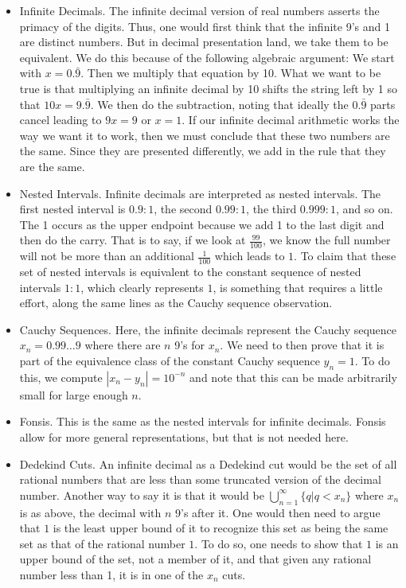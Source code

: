 \documentclass[12pt]{article}
\begin{document}
\begin{itemize}
    \item Infinite Decimals. The infinite decimal version of real numbers asserts the primacy of the digits. Thus, one would first think that the infinite 9's and 1 are distinct numbers. But in decimal presentation land, we take them to be equivalent. We do this because of the following algebraic argument: We start with $x = 0.\bar{9}$. Then we multiply that equation by 10. What we want to be true is that multiplying an infinite decimal by 10 shifts the string left by 1 so that $10x = 9.\bar{9}$. We then do the subtraction, noting that ideally the $0.\bar{9}$ parts cancel leading to $9x = 9$ or $x=1$. If our infinite decimal arithmetic works the way we want it to work, then we must conclude that these two numbers are the same. Since they are presented differently, we add in the rule that they are the same. 
    \item Nested Intervals. Infinite decimals are interpreted as nested intervals. The first nested interval is $0.9:1$, the second $0.99:1$, the third $0.999:1$, and so on. The 1 occurs as the upper endpoint because we add 1 to the last digit and then do the carry. That is to say, if we look at $\frac{99}{100}$, we know the full number will not be more than an additional $\frac{1}{100}$ which leads to $1$. To claim that these set of nested intervals is equivalent to the constant sequence of nested intervals $1:1$, which clearly represents $1$, is something that requires a little effort, along the same lines as the Cauchy sequence observation. 
    \item Cauchy Sequences. Here, the infinite decimals represent the Cauchy sequence $x_n = 0.99\ldots9$ where there are $n$ 9's for $x_n$. We need to then prove that it is part of the equivalence class of the constant Cauchy sequence $y_n = 1$. To do this, we compute $|x_n - y_n| = 10^{-n}$ and note that this can be made arbitrarily small for large enough $n$.
    \item Fonsis. This is the same as the nested intervals for infinite decimals. Fonsis allow for more general representations, but that is not needed here. 
    \item Dedekind Cuts.  An infinite decimal as a Dedekind cut would be the set of all rational numbers that are less than some truncated version of the decimal number. Another way to say it is that it would be $\bigcup_{n=1}^\infty \{q | q < x_n\}$ where $x_n$ is as above, the decimal with $n$ 9's after it. One would then need to argue that $1$ is the least upper bound of it to recognize this set as being the same set as that of the rational number $1$. To do so, one needs to show that $1$ is an upper bound of the set, not a member of it, and that given any rational number less than 1, it is in one of the $x_n$ cuts. 

\end{itemize}
\end{document}

